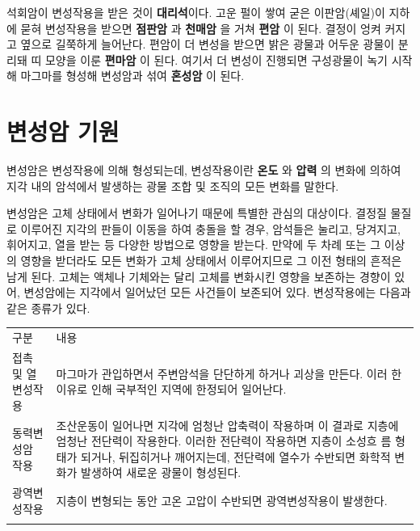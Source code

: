 \documentclass[12pt, a4paper, twoside]{book}
\begin{document}
				석회암이 변성작용을 받은 것이 \textbf{대리석}이다. 
				고운 펄이 쌓여 굳은 이판암(셰일)이 지하에 묻혀 변성작용을 받으면 \textbf{ 점판암 }과 \textbf{ 천매암 }을 거쳐 \textbf{ 편암 }이 된다. 
				결정이 엉켜 커지고 옆으로 길쭉하게 늘어난다.  
				편암이 더 변성을 받으면 밝은 광물과 어두운 광물이 분리돼 띠 모양을 이룬 \textbf{ 편마암 }이 된다. 
				여기서 더 변성이 진행되면 구성광물이 녹기 시작해 마그마를 형성해 변성암과 섞여 \textbf{ 혼성암 }이 된다.



	\clearpage
	\section{변성암 기원}
	

				변성암은 변성작용에 의해 형성되는데,  변성작용이란 \textbf{ 온도 }와 \textbf{ 압력 }의 변화에 의하여 지각 내의 암석에서 발생하는 광물 조합 및 조직의 모든 변화를 말한다. 

				변성암은 고체 상태에서 변화가 일어나기 때문에 특별한 관심의 대상이다. 
				결정질 물질로 이루어진 지각의 판들이 이동을 하여 충돌을 할 경우, 암석들은 눌리고, 당겨지고, 휘어지고, 열을 받는 등 다양한 방법으로 영향을 받는다. 
				만약에 두 차례 또는 그 이상의 영향을 받더라도 모든 변화가 고체 상태에서 이루어지므로 그 이전 형태의 흔적은 남게 된다. 
				고체는 액체나 기체와는 달리 고체를 변화시킨 영향을 보존하는 경향이 있어, 변성암에는 지각에서 일어났던 모든 사건들이 보존되어 있다. 변성작용에는 다음과 같은 종류가 있다. 
				\tab

				\begin{tabu} to 1.0\textwidth { X[l, 1.0] X[l, 3.0] }
				\tabucline[0.2ex]{-}		
				구분		&내용 \\
				\tabucline[0.1ex]{-}		
				접촉 및 열변성작용 &
				마그마가 관입하면서 주변암석을 단단하게 하거나 괴상을 만든다. 이러   한 이유로 인해 국부적인 지역에 한정되어 일어난다. \\
				\tabucline[0.1ex]{-}		
				동력변성암 작용 &
				조산운동이 일어나면 지각에 엄청난 압축력이 작용하며 이 결과로 지층에 엄청난 전단력이 작용한다. 
				이러한 전단력이 작용하면 지층이 소성흐   름 형태가 되거나, 뒤집히거나 깨어지는데, 전단력에 열수가 수반되면 화학적 변화가 발생하여 새로운 광물이 형성된다. \\
				\tabucline[0.1ex]{-}		
				광역변성작용 &
				지층이 변형되는 동안 고온 고압이 수반되면 광역변성작용이 발생한다. \\
				\tabucline[0.1ex]{-}		
				\end{tabu} 
\end{document}

